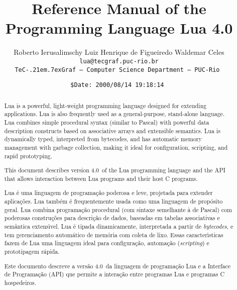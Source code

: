 \documentclass[11pt]{article}
\def\tecgraf{{\sf TeC\kern-.21em\lower.7ex\hbox{Graf}}}
\newcommand{\Version}{4.0}
\begin{document}
\title{Reference Manual of the Programming Language Lua \Version}

\author{%
Roberto Ierusalimschy\quad
Luiz Henrique de Figueiredo\quad
Waldemar Celes
\vspace{1.0ex}\\
\smallskip
\small\tt lua@tecgraf.puc-rio.br
\vspace{2.0ex}\\
\tecgraf\ --- Computer Science Department --- PUC-Rio
}

\date{{\small \tt\$Date: 2000/08/14 19:18:14 $ $}}

\maketitle

\thispagestyle{empty}
\pagestyle{empty}

\begin{abstract}
\noindent
Lua is a powerful, light-weight programming language
designed for extending applications.
Lua is also frequently used as a general-purpose, stand-alone language.
Lua combines simple procedural syntax
(similar to Pascal)
with
powerful data description constructs
based on associative arrays and extensible semantics.
Lua is
dynamically typed,
interpreted from bytecodes,
and has automatic memory management with garbage collection,
making it ideal for
configuration,
scripting,
and
rapid prototyping.

This document describes version \Version\ of the Lua programming language
and the API that allows interaction between Lua programs and their
host C programs.
\end{abstract}

\def\abstractname{Resumo}
\begin{abstract}
\noindent
Lua \'e uma linguagem de programa\c{c}\~ao
poderosa e leve,
projetada para extender aplica\c{c}\~oes.
Lua tamb\'em \'e frequentemente usada como uma linguagem de prop\'osito geral.
Lua combina programa\c{c}\~ao procedural
(com sintaxe semelhante \`a de Pascal)
com
poderosas constru\c{c}\~oes para descri\c{c}\~ao de dados,
baseadas em tabelas associativas e sem\^antica extens\'\i vel.
Lua \'e
tipada dinamicamente,
interpretada a partir de \emph{bytecodes},
e tem gerenciamento autom\'atico de mem\'oria com coleta de lixo.
Essas caracter\'{\i}sticas fazem de Lua uma linguagem ideal para
configura\c{c}\~ao,
automa\c{c}\~ao (\emph{scripting})
e prototipagem r\'apida.

Este documento descreve a vers\~ao \Version\ da linguagem de
programa\c{c}\~ao Lua e a Interface de Programa\c{c}\~ao (API) que permite
a intera\c{c}\~ao entre programas Lua e programas C hospedeiros.
\end{abstract}
\end{document}
